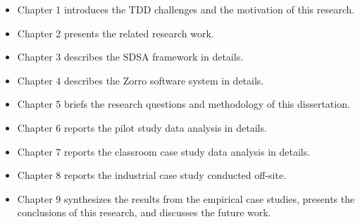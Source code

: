 \begin{itemize}
\item Chapter 1 introduces the TDD challenges and the motivation of this research. 
\item Chapter 2 presents the related research work. 
\item Chapter 3 describes the SDSA framework in details.
\item Chapter 4 describes the Zorro software system in details.
\item Chapter 5 briefs the research questions and methodology of this dissertation. 
\item Chapter 6 reports the pilot study data analysis in details.  
\item Chapter 7 reports the classroom case study data analysis in details.
\item Chapter 8 reports the industrial case study conducted off-site.
\item Chapter 9 synthesizes the results from the empirical case studies, presents
the conclusions of this research, and discusses the future work.
\end{itemize}

\begin{comment}

The software development is a highly cognitive process in which developers continuously interact with development environment tools to produce the software artifacts following a certain process. 

Software metrics are great assets out of research work in the software engineering discipline. The typical use of software metrics is through the Goal-Question-Metric (GQM) paradigm where the software metrics are used as the measure to high-level questions and goals.  A significant drawback of the GQM is that software metrics are not always possible to be collected, or can be collect in high cost. 
\end{comment}

